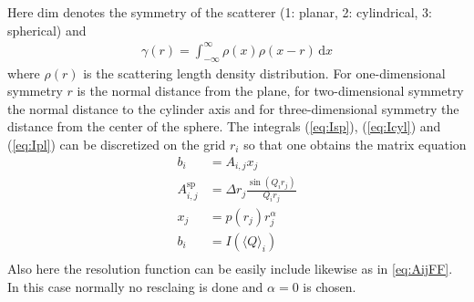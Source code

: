 Here $\mathrm{dim}$ denotes the symmetry of the scatterer (1: planar, 2: cylindrical, 3: spherical) and
\begin{align}
\gamma(r) = \int_{-\infty}^{\infty} \rho(x)\rho(x-r)\,\mathrm{d}x
\end{align}
where $\rho(r)$ is the scattering length density distribution. For one-dimensional symmetry $r$ is the normal distance from the plane, for two-dimensional symmetry the normal distance to the cylinder axis and for three-dimensional symmetry the distance from the center of the sphere.
The integrals (\ref{eq:Isp}), (\ref{eq:Icyl}) and (\ref{eq:Ipl}) can be discretized on the grid $r_i$ so that one obtains the matrix equation
\begin{align}
b_i &= A_{i,j} x_j \\
A_{i,j}^\mathrm{sp} &= \Delta r_j \frac{\sin(Q_i r_j)}{Q_i r_j}\\
x_j &= p(r_j) r_j^{\alpha}\\
b_i &= I(\langle Q\rangle_i) \\
\end{align}
Also here the resolution function can be easily include likewise as in \ref{eq:AijFF}. In this case normally no resclaing is done and $\alpha=0$ is chosen.

